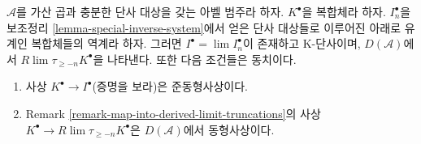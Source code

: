 \begin{lemma}
\label{lemma-difficulty-K-injectives}
$\mathcal{A}$를 가산 곱과 충분한 단사 대상을 갖는 아벨 범주라 하자.
$K^\bullet$을 복합체라 하자. $I_n^\bullet$을 보조정리
\ref{lemma-special-inverse-system}에서 얻은 단사 대상들로 이루어진
아래로 유계인 복합체들의 역계라 하자. 그러면
$I^\bullet = \lim I_n^\bullet$이 존재하고 K-단사이며,
$D(\mathcal{A})$에서 $R\lim \tau_{\geq -n}K^\bullet$을 나타낸다.
또한 다음 조건들은 동치이다.
\begin{enumerate}
\item 사상 $K^\bullet \to I^\bullet$(증명을 보라)은 준동형사상이다.
\item Remark \ref{remark-map-into-derived-limit-truncations}의 사상
$K^\bullet \to R\lim \tau_{\geq -n}K^\bullet$은
$D(\mathcal{A})$에서 동형사상이다.
\end{enumerate}
\end{lemma}

